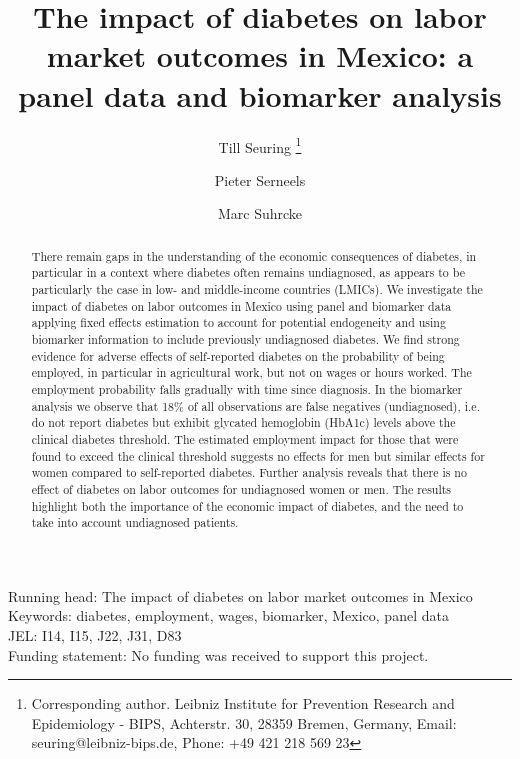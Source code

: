 \documentclass[12pt,english]{article}
\begin{document}
	\title{The impact of diabetes on labor market outcomes in Mexico: a panel data and biomarker analysis}
	
	\author[a,b]{Till Seuring%
		\thanks{Corresponding author. Leibniz Institute for Prevention Research and Epidemiology - BIPS, Achterstr. 30, 28359 Bremen, Germany, Email: seuring@leibniz-bips.de, Phone: +49 421 218 569 23}}
	\author[b]{Pieter Serneels}
	\author[c]{Marc Suhrcke}
	
	\date{}	
	
	
	
	\maketitle 
	
	    \noindent Running head: The impact of diabetes on labor market outcomes in Mexico\\
		Keywords: diabetes, employment, wages, biomarker, Mexico, panel data\\
		JEL: I14, I15, J22, J31, D83\\
		Funding statement: No funding was received to support this project.
	\thispagestyle{empty}
	\clearpage
	
\begin{abstract}
There remain gaps in the understanding of the economic consequences of diabetes, in particular in a context where diabetes often remains undiagnosed, as appears to be particularly the case in low- and middle-income countries (LMICs). We investigate the impact of diabetes on labor outcomes in Mexico using panel and biomarker data applying fixed effects estimation to account for potential endogeneity and using biomarker information to include previously undiagnosed diabetes. We find strong evidence for adverse effects of self-reported diabetes on the probability of being employed, in particular in agricultural work, but not on wages or hours worked. The employment probability falls gradually with time since diagnosis. In the biomarker analysis we observe that 18\% of all observations are false negatives (undiagnosed), i.e. do not report diabetes but exhibit glycated hemoglobin (HbA1c) levels above the clinical diabetes threshold. The estimated employment impact for those that were found to exceed the clinical threshold suggests no effects for men but similar effects for women compared to self-reported diabetes. Further analysis reveals that there is no effect of diabetes on labor outcomes for undiagnosed women or men. The results highlight both the importance of the economic impact of diabetes, and the need to take into account undiagnosed patients.
\end{abstract}
\end{document}
